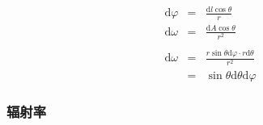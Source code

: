 \documentclass{beamer}
\newcommand{\cdummy}{\cdot}
\newcommand{\mathd}{\mathrm{d}}
\newcommand{\nospace}{}
\begin{document}
{{\begin{frame}
  \frametitle{}
  \begin{eqnarray*}
    \mathd \varphi & = & \frac{\mathd l \nospace \cos \theta}{r}\\
    \mathd \omega & = & \frac{\mathd A \nospace \cos \theta}{r^2}\\
    &  & \\
    \mathd \omega & = & \frac{r \nospace \sin \theta \mathd \varphi \cdummy r
    \mathd \theta}{r^2}\\
    & = & \nospace \sin \theta \mathd \theta \mathd \varphi
  \end{eqnarray*}
\end{frame}

\begin{frame}
  \frametitle{辐射率}
  
  {\hspace{5em}}
\end{frame}

}}
\end{document}
